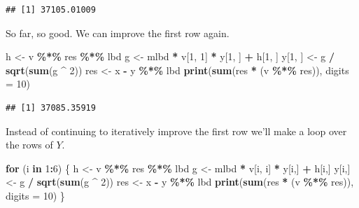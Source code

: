 \documentclass[
  12pt,
]{article}
\newenvironment{Shaded}{\begin{snugshade}}{\end{snugshade}}
\newcommand{\AttributeTok}[1]{\textcolor[rgb]{0.13,0.29,0.53}{#1}}
\newcommand{\ControlFlowTok}[1]{\textcolor[rgb]{0.13,0.29,0.53}{\textbf{#1}}}
\newcommand{\DecValTok}[1]{\textcolor[rgb]{0.00,0.00,0.81}{#1}}
\newcommand{\FunctionTok}[1]{\textcolor[rgb]{0.13,0.29,0.53}{\textbf{#1}}}
\newcommand{\NormalTok}[1]{#1}
\newcommand{\OtherTok}[1]{\textcolor[rgb]{0.56,0.35,0.01}{#1}}
\newcommand{\SpecialCharTok}[1]{\textcolor[rgb]{0.81,0.36,0.00}{\textbf{#1}}}
\begin{document}
\begin{verbatim}
## [1] 37105.01009
\end{verbatim}

So far, so good. We can improve the first row again.

\begin{Shaded}
\begin{Highlighting}[]
\NormalTok{h }\OtherTok{\textless{}{-}}\NormalTok{ v }\SpecialCharTok{\%*\%}\NormalTok{ res }\SpecialCharTok{\%*\%}\NormalTok{ lbd}
\NormalTok{g }\OtherTok{\textless{}{-}}\NormalTok{ mlbd }\SpecialCharTok{*}\NormalTok{ v[}\DecValTok{1}\NormalTok{, }\DecValTok{1}\NormalTok{] }\SpecialCharTok{*}\NormalTok{ y[}\DecValTok{1}\NormalTok{, ] }\SpecialCharTok{+}\NormalTok{ h[}\DecValTok{1}\NormalTok{, ]}
\NormalTok{y[}\DecValTok{1}\NormalTok{, ] }\OtherTok{\textless{}{-}}\NormalTok{ g }\SpecialCharTok{/} \FunctionTok{sqrt}\NormalTok{(}\FunctionTok{sum}\NormalTok{(g }\SpecialCharTok{\^{}} \DecValTok{2}\NormalTok{))}
\NormalTok{res }\OtherTok{\textless{}{-}}\NormalTok{ x }\SpecialCharTok{{-}}\NormalTok{ y }\SpecialCharTok{\%*\%}\NormalTok{ lbd}
\FunctionTok{print}\NormalTok{(}\FunctionTok{sum}\NormalTok{(res }\SpecialCharTok{*}\NormalTok{ (v }\SpecialCharTok{\%*\%}\NormalTok{ res)), }\AttributeTok{digits =} \DecValTok{10}\NormalTok{)}
\end{Highlighting}
\end{Shaded}

\begin{verbatim}
## [1] 37085.35919
\end{verbatim}

Instead of continuing to iteratively improve the first row we'll make a loop over the rows of \(Y\).

\begin{Shaded}
\begin{Highlighting}[]
\ControlFlowTok{for}\NormalTok{ (i }\ControlFlowTok{in} \DecValTok{1}\SpecialCharTok{:}\DecValTok{6}\NormalTok{) \{}
\NormalTok{  h }\OtherTok{\textless{}{-}}\NormalTok{ v }\SpecialCharTok{\%*\%}\NormalTok{ res }\SpecialCharTok{\%*\%}\NormalTok{ lbd}
\NormalTok{  g }\OtherTok{\textless{}{-}}\NormalTok{ mlbd }\SpecialCharTok{*}\NormalTok{ v[i, i] }\SpecialCharTok{*}\NormalTok{ y[i,] }\SpecialCharTok{+}\NormalTok{ h[i,]}
\NormalTok{  y[i,] }\OtherTok{\textless{}{-}}\NormalTok{ g }\SpecialCharTok{/} \FunctionTok{sqrt}\NormalTok{(}\FunctionTok{sum}\NormalTok{(g }\SpecialCharTok{\^{}} \DecValTok{2}\NormalTok{))}
\NormalTok{  res }\OtherTok{\textless{}{-}}\NormalTok{ x }\SpecialCharTok{{-}}\NormalTok{ y }\SpecialCharTok{\%*\%}\NormalTok{ lbd}
  \FunctionTok{print}\NormalTok{(}\FunctionTok{sum}\NormalTok{(res }\SpecialCharTok{*}\NormalTok{ (v }\SpecialCharTok{\%*\%}\NormalTok{ res)), }\AttributeTok{digits =} \DecValTok{10}\NormalTok{)}
\NormalTok{\}}
\end{Highlighting}
\end{Shaded}
\end{document}
